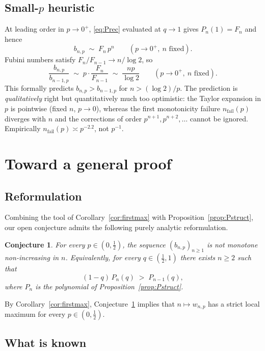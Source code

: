 \documentclass{article}
\newtheorem{conjecture}[proposition]{Conjecture}
\theoremstyle{definition}
\theoremstyle{remark}
\begin{document}
\subsection*{Small-$p$ heuristic}

At leading order in $p\to 0^{+}$, \eqref{eq:Prec} evaluated at $q\to 1$
gives $P_{n}(1)=F_{n}$ and hence
\[
  b_{n,p}\;\sim\;F_{n}\,p^{n}\qquad(p\to 0^{+},\ n\text{ fixed}).
\]
Fubini numbers satisfy $F_{n}/F_{n-1}\to n/\log 2$, so
\[
  \frac{b_{n,p}}{b_{n-1,p}}\;\sim\;p\cdot\frac{F_{n}}{F_{n-1}}\;\sim\;\frac{np}{\log 2}
  \qquad(p\to 0^{+},\ n\text{ fixed}).
\]
This formally predicts $b_{n,p}>b_{n-1,p}$ for $n>(\log 2)/p$. The
prediction is \emph{qualitatively} right but quantitatively much too
optimistic: the Taylor expansion in $p$ is pointwise (fixed $n$, $p\to 0$),
whereas the first monotonicity failure $n_{\mathrm{fail}}(p)$ diverges
with $n$ and the corrections of order $p^{n+1},p^{n+2},\dots$ cannot be
ignored. Empirically $n_{\mathrm{fail}}(p)\asymp p^{-2.2}$, not $p^{-1}$.

\section*{Toward a general proof}

\subsection*{Reformulation}

Combining the tool of Corollary~\ref{cor:firstmax} with
Proposition~\ref{prop:Pstruct}, our open conjecture admits the following
purely analytic reformulation.

\begin{conjecture}\label{conj:main}
For every $p\in(0,\tfrac12)$, the sequence $(b_{n,p})_{n\ge 1}$ is
\emph{not} monotone non-increasing in $n$. Equivalently, for every
$q\in(\tfrac12,1)$ there exists $n\ge 2$ such that
\begin{equation}\label{eq:conj}
  (1-q)\,P_{n}(q)\;>\;P_{n-1}(q),
\end{equation}
where $P_{n}$ is the polynomial of Proposition~\ref{prop:Pstruct}.
\end{conjecture}

By Corollary~\ref{cor:firstmax}, Conjecture~\ref{conj:main} implies that
$n\mapsto w_{n,p}$ has a strict local maximum for every $p\in(0,\tfrac12)$.

\subsection*{What is known}
\end{document}
